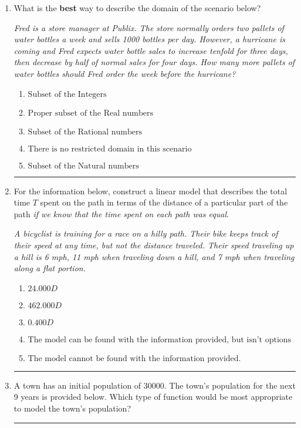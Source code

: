 \documentclass[14pt]{extbook}
\newcommand{\litem}[1]{\item#1\hspace*{-1cm}\rule{\textwidth}{0.4pt}}
\begin{document}
\begin{enumerate}
{\begin{enumerate}[label=\Alph*.]
\end{enumerate} }
\litem{
What is the \textbf{best} way to describe the domain of the scenario below?
\begin{center}
    \textit{ Fred is a store manager at Publix. The store normally orders two pallets of water bottles a week and sells 1000 bottles per day. However, a hurricane is coming and Fred expects water bottle sales to increase tenfold for three days, then decrease by half of normal sales for four days. How many more pallets of water bottles should Fred order the week before the hurricane? }
\end{center}
\begin{enumerate}[label=\Alph*.]
\item \( \text{Subset of the Integers} \)
\item \( \text{Proper subset of the Real numbers} \)
\item \( \text{Subset of the Rational numbers} \)
\item \( \text{There is no restricted domain in this scenario} \)
\item \( \text{Subset of the Natural numbers} \)

\end{enumerate} }
\litem{
For the information below, construct a linear model that describes the total time $T$ spent on the path in terms of the distance of a particular part of the path \textit{if we know that the time spent on each path was equal}.
\begin{center}
    \textit{ A bicyclist is training for a race on a hilly path. Their bike keeps track of their speed at any time, but not the distance traveled. Their speed traveling up a hill is 6 mph, 11 mph when traveling down a hill, and 7 mph when traveling along a flat portion. }
\end{center}
\begin{enumerate}[label=\Alph*.]
\item \( 24.000 D \)
\item \( 462.000 D \)
\item \( 0.400 D \)
\item \( \text{The model can be found with the information provided, but isn't options 1-3.} \)
\item \( \text{The model cannot be found with the information provided.} \)

\end{enumerate} }
\litem{
A town has an initial population of 30000. The town's population for the next 9 years is provided below. Which type of function would be most appropriate to model the town's population?

}
\end{enumerate}
\end{document}
